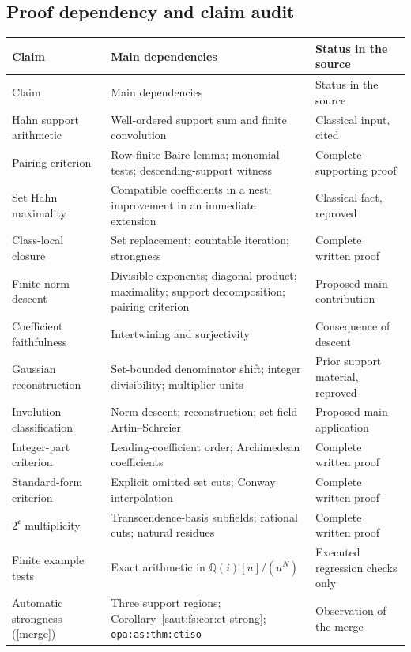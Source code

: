 \documentclass[11pt]{article}
\theoremstyle{definition}
\theoremstyle{remark}
\newcommand{\Q}{\mathbb Q}
\newcommand{\lbl}[1]{\nolinkurl{#1}}%
\newcommand{\cc}{\mathfrak c}
\newcommand{\mergetag}{\textup{[merge]}}
\numberwithin{equation}{section}
\begin{document}
\subsection{Proof dependency and claim audit}

\begin{center}
\small
\begin{longtable}{@{}>{\RaggedRight\arraybackslash}p{}>{\RaggedRight\arraybackslash}p{}>{\RaggedRight\arraybackslash}p{}@{}}
\toprule
Claim & Main dependencies & Status in the source\\
\midrule
\endfirsthead
\toprule
Claim & Main dependencies & Status in the source\\
\midrule
\endhead
Hahn support arithmetic & Well-ordered support sum and finite convolution & Classical input, cited\\
Pairing criterion & Row-finite Baire lemma; monomial tests; descending-support witness & Complete supporting proof\\
Set Hahn maximality & Compatible coefficients in a nest; improvement in an immediate extension & Classical fact, reproved\\
Class-local closure & Set replacement; countable iteration; strongness & Complete written proof\\
Finite norm descent & Divisible exponents; diagonal product; maximality; support decomposition; pairing criterion & Proposed main contribution\\
Coefficient faithfulness & Intertwining and surjectivity & Consequence of descent\\
Gaussian reconstruction & Set-bounded denominator shift; integer divisibility; multiplier units & Prior support material, reproved\\
Involution classification & Norm descent; reconstruction; set-field Artin--Schreier & Proposed main application\\
Integer-part criterion & Leading-coefficient order; Archimedean coefficients & Complete written proof\\
Standard-form criterion & Explicit omitted set cuts; Conway interpolation & Complete written proof\\
$2^{\cc}$ multiplicity & Transcendence-basis subfields; rational cuts; natural residues & Complete written proof\\
Finite example tests & Exact arithmetic in $\Q(i)[u]/(u^N)$ & Executed regression checks only\\
Automatic strongness (\mergetag) & Three support regions; Corollary~\ref{saut:fs:cor:ct-strong}; \lbl{opa:as:thm:ctiso} & Observation of the merge\\
\bottomrule
\end{longtable}
\end{center}
\end{document}
